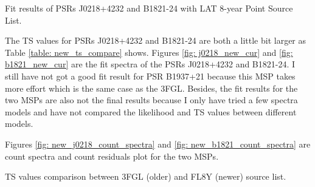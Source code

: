 \documentclass[12pt]{report}
\newcommand{\mycaption}[1]{\protect \caption{#1}}
\begin{document}
    \begin{table}[!htp]
      \centering
        \mycaption{Fit results of PSRs J0218+4232 and B1821-24 with LAT 8-year Point 
          Source List.}
        \label{table: new_results_all_three}        
    \end{table}  
  
    The TS values for PSRs J0218+4232 and B1821-24 are both a little bit larger as Table 
    \ref{table: new_ts_compare} shows. Figures \ref{fig: j0218_new_cur} and 
    \ref{fig: b1821_new_cur} are the fit spectra of the PSRs
    J0218+4232 and B1821-24. I still have not got a good fit result for PSR B1937+21 because 
    this MSP takes more effort which is the same case as the 3FGL. Besides, the fit 
    results for the two MSPs are also not the final results because I only have tried a 
    few spectra models and have not compared the likelihood and TS values between different 
    models. 

    Figures \ref{fig: new_j0218_count_spectra} and \ref{fig: new_b1821_count_spectra} are 
    count spectra and count residuals plot for the two MSPs. 
    \begin{table}[!htp]
      \centering
        \mycaption{TS values comparison between 3FGL (older) and FL8Y (newer) source list.}
        \label{table: new_ts_compare}        
    \end{table}  
    
\end{document}
